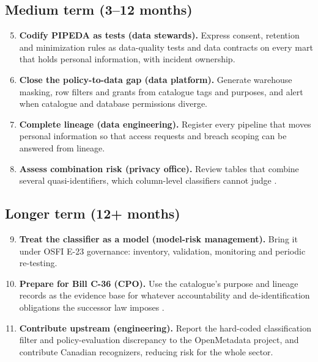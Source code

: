 \documentclass[journal,onecolumn,11pt]{IEEEtran}
\begin{document}
\subsection{Medium term (3--12 months)}
\begin{enumerate}\setcounter{enumi}{4}
\item \textbf{Codify PIPEDA as tests (data stewards).} Express consent, retention and minimization rules as data-quality tests and data contracts on every mart that holds personal information, with incident ownership.
\item \textbf{Close the policy-to-data gap (data platform).} Generate warehouse masking, row filters and grants from catalogue tags and purposes, and alert when catalogue and database permissions diverge.
\item \textbf{Complete lineage (data engineering).} Register every pipeline that moves personal information so that access requests and breach scoping can be answered from lineage.
\item \textbf{Assess combination risk (privacy office).} Review tables that combine several quasi-identifiers, which column-level classifiers cannot judge \cite{sweeney,rocher}.
\end{enumerate}

\subsection{Longer term (12+ months)}
\begin{enumerate}\setcounter{enumi}{8}
\item \textbf{Treat the classifier as a model (model-risk management).} Bring it under OSFI E-23 governance: inventory, validation, monitoring and periodic re-testing.
\item \textbf{Prepare for Bill C-36 (CPO).} Use the catalogue's purpose and lineage records as the evidence base for whatever accountability and de-identification obligations the successor law imposes \cite{billc36}.
\item \textbf{Contribute upstream (engineering).} Report the hard-coded classification filter and policy-evaluation discrepancy to the OpenMetadata project, and contribute Canadian recognizers, reducing risk for the whole sector.
\end{enumerate}

\end{document}
